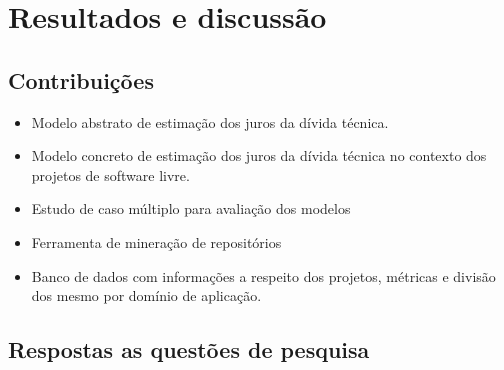 \chapter{Resultados e discussão}



\section{Contribuições}
\begin{itemize}

\item Modelo abstrato de estimação dos juros da dívida técnica.
\item Modelo concreto de estimação dos juros da dívida técnica no contexto dos projetos de software livre.
\item Estudo de caso múltiplo para avaliação dos modelos
\item Ferramenta de mineração de repositórios
\item Banco de dados com informações a respeito dos projetos, métricas e divisão dos mesmo por domínio de aplicação.
\end{itemize}

\section{Respostas as questões de pesquisa}